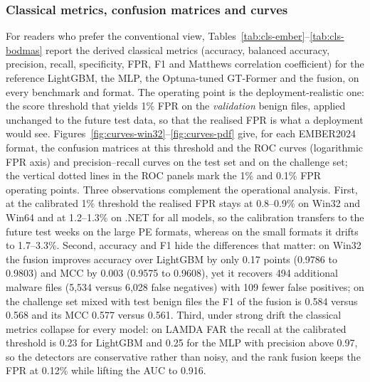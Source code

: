 \documentclass[fleqn,10pt]{wlscirep}
\newcommand{\gtf}{GT\mbox{-}Former}
\newcommand{\lgbm}{LightGBM}
\begin{document}
\subsubsection{Classical metrics, confusion matrices and curves}
\label{sec:classical}
For readers who prefer the conventional view, Tables~\ref{tab:cls-ember}--\ref{tab:cls-bodmas} report the derived classical metrics (accuracy, balanced accuracy, precision, recall, specificity, FPR, F1 and Matthews correlation coefficient) for the reference \lgbm{}, the MLP, the Optuna-tuned \gtf{} and the fusion, on every benchmark and format. The operating point is the deployment-realistic one: the score threshold that yields 1\% FPR on the \emph{validation} benign files, applied unchanged to the future test data, so that the realised FPR is what a deployment would see. Figures~\ref{fig:curves-win32}--\ref{fig:curves-pdf} give, for each EMBER2024 format, the confusion matrices at this threshold and the ROC curves (logarithmic FPR axis) and precision--recall curves on the test set and on the challenge set; the vertical dotted lines in the ROC panels mark the 1\% and 0.1\% FPR operating points. Three observations complement the operational analysis. First, at the calibrated 1\% threshold the realised FPR stays at 0.8--0.9\% on Win32 and Win64 and at 1.2--1.3\% on .NET for all models, so the calibration transfers to the future test weeks on the large PE formats, whereas on the small formats it drifts to 1.7--3.3\%. Second, accuracy and F1 hide the differences that matter: on Win32 the fusion improves accuracy over \lgbm{} by only 0.17 points (0.9786 to 0.9803) and MCC by 0.003 (0.9575 to 0.9608), yet it recovers 494 additional malware files (5,534 versus 6,028 false negatives) with 109 fewer false positives; on the challenge set mixed with test benign files the F1 of the fusion is 0.584 versus 0.568 and its MCC 0.577 versus 0.561. Third, under strong drift the classical metrics collapse for every model: on LAMDA FAR the recall at the calibrated threshold is 0.23 for \lgbm{} and 0.25 for the MLP with precision above 0.97, so the detectors are conservative rather than noisy, and the rank fusion keeps the FPR at 0.12\% while lifting the AUC to 0.916.
\end{document}
